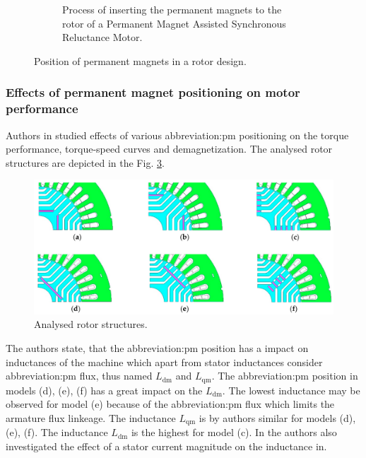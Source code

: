 \documentclass[a4paper, twoside, 11pt]{article}
\begin{document}
\begin{figure}[H]
\begin{subfigure}{0.4\textwidth}
            \caption{Process of inserting the permanent magnets to the rotor of a Permanent Magnet Assisted Synchronous Reluctance Motor. \cite{wang-synchronous-motors-for-traction-applications}}
            \label{fig:pm-inserted}
    \end{subfigure}
    \caption{Position of permanent magnets in a rotor design.}
\end{figure}

\FloatBarrier

\subsubsection{Effects of permanent magnet positioning on motor performance}
Authors in \cite{ngo-performance-analysis-of-synchronous-reluctance-motor-with-limited-amount-of-permanent-magnet} studied effects of various \gls{abbreviation:pm} positioning on the torque performance, torque-speed curves and demagnetization. The analysed rotor structures are depicted in the Fig. \ref{fig:pm-positioning-analysed-motor-types}.
    \begin{figure}[H]
            \centering
            \includegraphics[width=1\textwidth]{src/png/pm-positioning-analysed-motor-types.png}
            \caption{Analysed rotor structures. \cite{ngo-performance-analysis-of-synchronous-reluctance-motor-with-limited-amount-of-permanent-magnet}}
            \label{fig:pm-positioning-analysed-motor-types}
    \end{figure}
    The authors state, that the \gls{abbreviation:pm} position has a impact on inductances of the machine which apart from stator inductances consider \gls{abbreviation:pm} flux, thus named $L_{\text{dm}}$ and $L_{\text{qm}}$. The \gls{abbreviation:pm} position in models (d), (e), (f) has a great impact on the $L_{\text{dm}}$. The lowest inductance may be observed for model (e) because of the \gls{abbreviation:pm} flux which limits the armature flux linkeage. The inductance $L_{\text{qm}}$ is by authors similar for models (d), (e), (f). The inductance $L_{\text{dm}}$ is the highest for model (c). In \cite{ngo-performance-analysis-of-synchronous-reluctance-motor-with-limited-amount-of-permanent-magnet} the authors also investigated the effect of a stator current magnitude on the inductance in.\par
\end{document}
